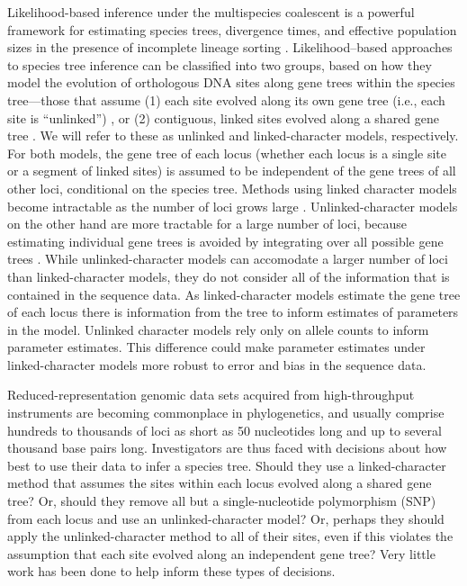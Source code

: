 Likelihood-based inference under the multispecies coalescent is a powerful 
framework for estimating species trees,  divergence times, and  effective 
population sizes in the presence of incomplete lineage sorting 
\citep{xuChallengesSpeciesTree2016}. Likelihood--based approaches to species 
tree inference can be classified into two groups, based on how they model the 
evolution of orthologous DNA sites along gene trees within the species 
tree---those that assume (1) each site evolved along its own gene tree 
(i.e., each site is ``unlinked'') 
\citep{bryantInferringSpeciesTrees2012, maioPoMoAlleleFrequencyBased2015}, 
or (2) contiguous, linked sites evolved along a shared gene tree 
\citep{liuSpeciesTreesGene2007, ogilvieStarBEAST2BringsFaster2017, 
yangBPPProgramSpecies2015}. We will refer to these as unlinked and 
linked-character models, respectively. For both models, the gene tree of each 
locus (whether each locus is a single site or a segment of linked sites) 
is assumed to be independent of the gene 
trees of all other loci, conditional on the species tree. Methods using linked 
character models become intractable as the number of loci grows large 
\citep{bryantInferringSpeciesTrees2012}. Unlinked-character models on the other 
hand are more tractable for a large number of loci, because  estimating 
individual gene trees is avoided by integrating over all possible gene trees 
\citep{bryantInferringSpeciesTrees2012}. While unlinked-character models can 
accomodate a larger number of loci than linked-character models, they do not 
consider all of the information that is contained in the sequence data. As 
linked-character models estimate the gene tree of each locus there is 
information from the tree to inform estimates of parameters in the model. 
Unlinked character models rely only on allele counts to inform parameter 
estimates. This difference could make parameter estimates under linked-character 
models more robust to error and bias in the sequence data.

Reduced-representation genomic data sets acquired from high-throughput instruments
are becoming commonplace in phylogenetics, and usually comprise hundreds to 
thousands of loci as short as 50 nucleotides long and up to several thousand 
base pairs long. 
Investigators are thus faced with decisions about how best to use their data to 
infer a species tree. Should they use a linked-character method that assumes the 
sites within each locus evolved along a shared gene tree? Or, should they remove 
all but a single-nucleotide polymorphism (SNP) from each locus and use an 
unlinked-character model? Or, perhaps they should apply the unlinked-character 
method to all of their sites, even if this violates the assumption that each 
site evolved along an independent gene tree? Very little work has been done to 
help inform these types of decisions. 

